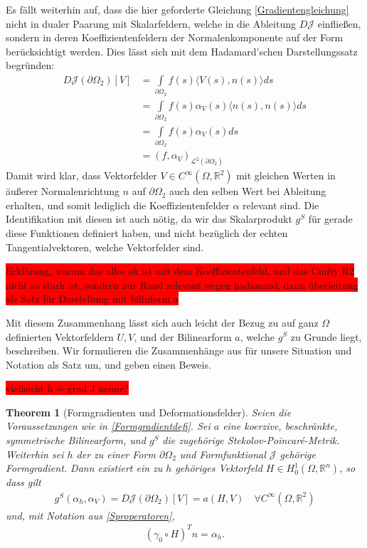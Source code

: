 \documentclass[bibliography=totoc,12pt,a4paper]{scrartcl}
\theoremstyle{exampstyle}
\newtheorem{theorem}[defi]{Theorem}
\numberwithin{equation}{section}
\begin{document}
Es fällt weiterhin auf, dass die hier geforderte Gleichung \ref{Gradientengleichung} nicht in dualer Paarung mit Skalarfeldern, welche in die Ableitung $D\mathcal{J}$ einfließen, sondern in deren Koeffizientenfeldern der Normalenkomponente auf der Form berücksichtigt werden. Dies lässt sich mit dem Hadamard'schen Darstellungssatz begründen:
\begin{align*}
	D\mathcal{J}(\partial\Omega_2)[V] &= \underset{\partial\Omega_2}{\int}f(s)\langle V(s),n(s)\rangle ds \\
	&=\underset{\partial\Omega_2}{\int}f(s) \alpha_V(s)\langle n(s),n(s)\rangle ds \\
	&=\underset{\partial\Omega_2}{\int}f(s) \alpha_V(s) ds \\
	&= (f,\alpha_V)_{\mathcal{L}^2(\partial\Omega_2)}
\end{align*}
Damit wird klar, dass Vektorfelder $V\in C^\infty(\Omega,\mathbb{R}^2)$ mit gleichen Werten in äußerer Normalenrichtung $n$ auf $\partial\Omega_2$ auch den selben Wert bei Ableitung erhalten, und somit lediglich die Koeffizientenfelder $\alpha$ relevant sind. Die Identifikation mit diesen ist auch nötig, da wir das Skalarprodukt $g^S$ für gerade diese Funktionen definiert haben, und nicht bezüglich der echten Tangentialvektoren, welche Vektorfelder sind.

\colorbox{red}{Erklärung, warum das alles ok ist mit dem Koeffizientenfeld, und das Cinfty R2 nicht so stark ist, sondern nur Rand relevant wegen hadamard, dann überleitung als Satz für Darstellung mit bilinform a }

Mit diesem Zusammenhang lässt sich auch leicht der Bezug zu auf ganz $\Omega$ definierten Vektorfeldern $U,V$, und der Bilinearform $a$, welche $g^S$ zu Grunde liegt, beschreiben. Wir formulieren die Zusammenhänge aus \cite{bfgs1} für unsere Situation und Notation als Satz um, und geben einen Beweis. 

\colorbox{red}{vielleicht h = grad J nenne?}

\begin{theorem}[Formgradienten und Deformationsfelder]
Seien die Voraussetzungen wie in \ref{Formgradientdefi}. Sei $a$ eine koerzive, beschränkte, symmetrische Bilinearform, und $g^S$ die zugehörige Stekolov-Poincaré-Metrik. Weiterhin sei $h$ der zu einer Form $\partial\Omega_2$ und Formfunktional $\mathcal{J}$ gehörige Formgradient. Dann existiert ein zu $h$ gehöriges Vektorfeld $H \in H^1_0(\Omega, \mathbb{R}^n)$, so dass gilt
\begin{align}\label{zentraleDeformation}
	g^S(\alpha_h, \alpha_V) = D\mathcal{J}(\partial\Omega_2)[V] = a(H,V) \quad \forall C^\infty(\Omega,\mathbb{R}^2)
\end{align}
und, mit Notation aus \ref{Sproperatoren},
\begin{align*}
	(\gamma_0\circ H)^T n = \alpha_h.
\end{align*}
\end{theorem}
\end{document}
